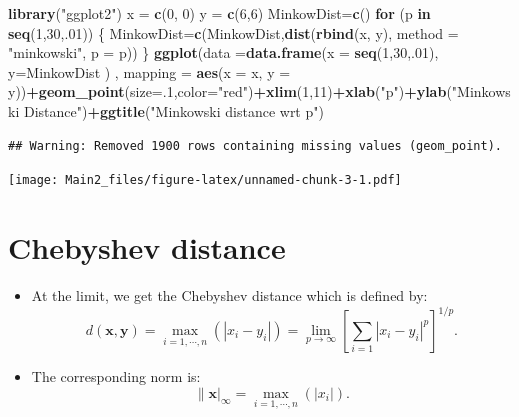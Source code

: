 \documentclass[
]{article}
\newenvironment{Shaded}{\begin{snugshade}}{\end{snugshade}}
\newcommand{\ControlFlowTok}[1]{\textcolor[rgb]{0.13,0.29,0.53}{\textbf{#1}}}
\newcommand{\DataTypeTok}[1]{\textcolor[rgb]{0.13,0.29,0.53}{#1}}
\newcommand{\DecValTok}[1]{\textcolor[rgb]{0.00,0.00,0.81}{#1}}
\newcommand{\KeywordTok}[1]{\textcolor[rgb]{0.13,0.29,0.53}{\textbf{#1}}}
\newcommand{\NormalTok}[1]{#1}
\newcommand{\OperatorTok}[1]{\textcolor[rgb]{0.81,0.36,0.00}{\textbf{#1}}}
\newcommand{\StringTok}[1]{\textcolor[rgb]{0.31,0.60,0.02}{#1}}
\providecommand{\tightlist}{%
  \setlength{\itemsep}{0pt}\setlength{\parskip}{0pt}}
\begin{document}
\begin{Shaded}
\begin{Highlighting}[]
\KeywordTok{library}\NormalTok{(}\StringTok{"ggplot2"}\NormalTok{)}
\NormalTok{x =}\StringTok{ }\KeywordTok{c}\NormalTok{(}\DecValTok{0}\NormalTok{, }\DecValTok{0}\NormalTok{)}
\NormalTok{y =}\StringTok{ }\KeywordTok{c}\NormalTok{(}\DecValTok{6}\NormalTok{,}\DecValTok{6}\NormalTok{)}
\NormalTok{MinkowDist=}\KeywordTok{c}\NormalTok{()}
\ControlFlowTok{for}\NormalTok{ (p }\ControlFlowTok{in} \KeywordTok{seq}\NormalTok{(}\DecValTok{1}\NormalTok{,}\DecValTok{30}\NormalTok{,.}\DecValTok{01}\NormalTok{))}
\NormalTok{\{}
\NormalTok{MinkowDist=}\KeywordTok{c}\NormalTok{(MinkowDist,}\KeywordTok{dist}\NormalTok{(}\KeywordTok{rbind}\NormalTok{(x, y), }\DataTypeTok{method =} \StringTok{"minkowski"}\NormalTok{, }\DataTypeTok{p =}\NormalTok{ p))     }
\NormalTok{\}}
\KeywordTok{ggplot}\NormalTok{(}\DataTypeTok{data =}\KeywordTok{data.frame}\NormalTok{(}\DataTypeTok{x =} \KeywordTok{seq}\NormalTok{(}\DecValTok{1}\NormalTok{,}\DecValTok{30}\NormalTok{,.}\DecValTok{01}\NormalTok{), }\DataTypeTok{y=}\NormalTok{MinkowDist ) , }\DataTypeTok{mapping =} \KeywordTok{aes}\NormalTok{(}\DataTypeTok{x =}\NormalTok{ x, }\DataTypeTok{y =}\NormalTok{ y))}\OperatorTok{+}\KeywordTok{geom_point}\NormalTok{(}\DataTypeTok{size=}\NormalTok{.}\DecValTok{1}\NormalTok{,}\DataTypeTok{color=}\StringTok{"red"}\NormalTok{)}\OperatorTok{+}\KeywordTok{xlim}\NormalTok{(}\DecValTok{1}\NormalTok{,}\DecValTok{11}\NormalTok{)}\OperatorTok{+}\KeywordTok{xlab}\NormalTok{(}\StringTok{"p"}\NormalTok{)}\OperatorTok{+}\KeywordTok{ylab}\NormalTok{(}\StringTok{"Minkowski Distance"}\NormalTok{)}\OperatorTok{+}\KeywordTok{ggtitle}\NormalTok{(}\StringTok{"Minkowski distance wrt p"}\NormalTok{)}
\end{Highlighting}
\end{Shaded}

\begin{verbatim}
## Warning: Removed 1900 rows containing missing values (geom_point).
\end{verbatim}

\texttt{[image: Main2\_files/figure-latex/unnamed-chunk-3-1.pdf]}

\hypertarget{chebyshev-distance}{%
\section{Chebyshev distance}\label{chebyshev-distance}}

\begin{itemize}
\tightlist
\item
  At the limit, we get the Chebyshev distance which is defined by: \[
  d(\mathbf{x},\mathbf{y})=\max_{i=1,\cdots,n}(|x_i-y_i|)=\lim_{p\rightarrow\infty}
  \left[\sum_{i=1} |x_i-y_i|^{p}\right]^{1/p}.
  \]
\item
  The corresponding norm is: \[
  \|\mathbf{x}|_\infty=\max_{i=1,\cdots,n}(|x_i|).
  \]
\end{itemize}
\end{document}
